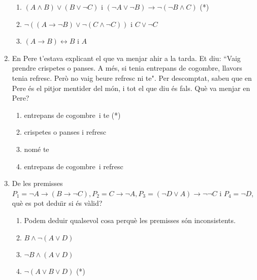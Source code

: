 \begin{enumerate}
\begin{enumerate}
\item $\left(  A\wedge B\right)  \vee\left(  B\vee\lnot C\right)  $ i $\left(
\lnot A\vee\lnot B\right)  \longrightarrow\lnot\left(  \lnot B\wedge C\right)
$ (*)

\item $\lnot\left(  (A\rightarrow\lnot B)\vee\lnot(C\wedge\lnot C)\right)  $ i
$C\vee\lnot C$

\item $\left(  A\longrightarrow B\right)  \longleftrightarrow B$ i $A$
\end{enumerate}

\item En Pere t'estava explicant el que va menjar ahir a la tarda. Et diu:
\textquotedblleft Vaig prendre crispetes o panses. A m\'{e}s, si tenia
entrepans de cogombre, llavors tenia refresc. Per\`{o} no vaig beure refresc
ni te". Per descomptat, sabeu que en Pere \'{e}s el pitjor mentider del
m\'{o}n, i tot el que diu \'{e}s fals. Qu\`{e} va menjar en Pere?

\begin{enumerate}
\item entrepans de cogombre\thinspace\ i te (*)

\item crispetes o panses i refresc

\item nom\'{e} te

\item entrepans de cogombre\thinspace\ i refresc
\end{enumerate}

\item De les premisses $P_{1}=\lnot A\longrightarrow\left(  B\longrightarrow
\lnot C\right)  ,P_{2}=C\longrightarrow\lnot A,P_{3}=\left(  \lnot D\vee
A\right)  \longrightarrow\lnot\lnot C$ i $P_{4}=\lnot D$, qu\`{e} es pot
dedu\"{\i}r si \'{e}s v\`{a}lid?

\begin{enumerate}
\item Podem deduir qualsevol cosa perqu\`{e} les premisses s\'{o}n inconsistents.

\item $B\wedge\lnot\left(  A\vee D\right)  $

\item $\lnot B\wedge\left(  A\vee D\right)  $

\item $\lnot\left(  A\vee B\vee D\right)  $ (*)
\end{enumerate}


\end{enumerate}
